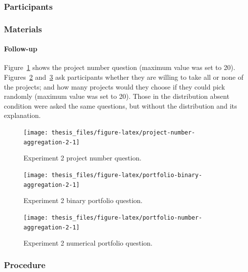 \documentclass[a4paper, nobind, dvipsnames]{templates/ociamthesis}
\theoremstyle{definition}
\theoremstyle{definition}
\theoremstyle{definition}
\theoremstyle{definition}
\theoremstyle{remark}
\begin{document}
\hypertarget{participants-8}{%
\subsubsection{Participants}\label{participants-8}}

\hypertarget{materials-6}{%
\subsubsection{Materials}\label{materials-6}}

\hypertarget{follow-up-materials-aggregation-2-appendix}{%
\paragraph{Follow-up}\label{follow-up-materials-aggregation-2-appendix}}

Figure~\ref{fig:project-number-aggregation-2} shows the project number
question (maximum value was set to 20).
Figures~\ref{fig:portfolio-binary-aggregation-2}
and~\ref{fig:portfolio-number-aggregation-2} ask participants whether they are
willing to take all or none of the projects; and how many projects would they
choose if they could pick randomly (maximum value was set to 20). Those in the
distribution absent condition were asked the same questions, but without the
distribution and its explanation.



\begin{figure}
\texttt{[image: thesis\_files/figure-latex/project-number-aggregation-2-1]} \caption{Experiment 2 project number question.}\label{fig:project-number-aggregation-2}
\end{figure}



\begin{figure}
\texttt{[image: thesis\_files/figure-latex/portfolio-binary-aggregation-2-1]} \caption{Experiment 2 binary portfolio question.}\label{fig:portfolio-binary-aggregation-2}
\end{figure}



\begin{figure}
\texttt{[image: thesis\_files/figure-latex/portfolio-number-aggregation-2-1]} \caption{Experiment 2 numerical portfolio question.}\label{fig:portfolio-number-aggregation-2}
\end{figure}

\hypertarget{procedure-5}{%
\subsubsection{Procedure}\label{procedure-5}}
\end{document}
